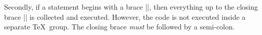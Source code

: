 	Secondly, if a statement begins with  a brace |{|, then 
	everything up to the closing brace |}| is collected
	and executed. However, the code is not executed inside
	a separate \TeX\ group.
	The closing brace \emph{must} be followed by a semi-colon.
	
\begin{codeexample}[]
\end{codeexample}






\endinput
